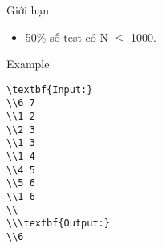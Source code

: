 Giới hạn
\begin{itemize}
	\item     50\% số test có N  $\le$  1000.   
\end{itemize}
Example
\begin{verbatim}
\textbf{Input:}
\\6 7
\\1 2
\\2 3
\\1 3
\\1 4
\\4 5
\\5 6
\\1 6
\\
\\\textbf{Output:}
\\6\end{verbatim}